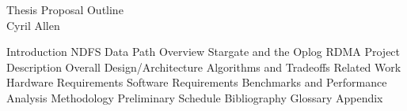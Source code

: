 \documentclass{article}
\begin{document}
\begin{center}
Thesis Proposal Outline \\
Cyril Allen
\end{center}

\begin{outline}[enumerate]
  \1 Introduction
    \2 NDFS
      \3 Data Path Overview
      \3 Stargate and the Oplog
    \2 RDMA
  \1 Project Description
  \1 Overall Design/Architecture
  \1 Algorithms and Tradeoffs
  \1 Related Work
  \1 Hardware Requirements
  \1 Software Requirements
  \1 Benchmarks and Performance Analysis Methodology
  \1 Preliminary Schedule
  \1 Bibliography
  \1 Glossary
  \1 Appendix
\end{outline}
\end{document}
